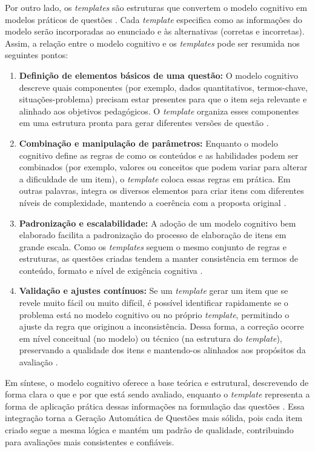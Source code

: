 Por outro lado, os \textit{templates} são estruturas que convertem o modelo cognitivo em modelos práticos de questões \cite{gierl2024}. Cada \textit{template} especifica como as informações do modelo serão incorporadas ao enunciado e às alternativas (corretas e incorretas). Assim, a relação entre o modelo cognitivo e os \textit{templates} pode ser resumida nos seguintes pontos:

\begin{enumerate} \item \textbf{Definição de elementos básicos de uma questão:} O modelo cognitivo descreve quais componentes (por exemplo, dados quantitativos, termos-chave, situações-problema) precisam estar presentes para que o item seja relevante e alinhado aos objetivos pedagógicos. O \textit{template} organiza esses componentes em uma estrutura pronta para gerar diferentes versões de questão \cite{lane2016}.
\item \textbf{Combinação e manipulação de parâmetros:} Enquanto o modelo cognitivo define as regras de como os conteúdos e as habilidades podem ser combinados (por exemplo, valores ou conceitos que podem variar para alterar a dificuldade de um item), o \textit{template} coloca essas regras em prática. Em outras palavras, integra os diversos elementos para criar itens com diferentes níveis de complexidade, mantendo a coerência com a proposta original \cite{embretson2017}.

\item \textbf{Padronização e escalabilidade:} A adoção de um modelo cognitivo bem elaborado facilita a padronização do processo de elaboração de itens em grande escala. Como os \textit{templates} seguem o mesmo conjunto de regras e estruturas, as questões criadas tendem a manter consistência em termos de conteúdo, formato e nível de exigência cognitiva \cite{gierl2016, gierl2017}.

\item \textbf{Validação e ajustes contínuos:} Se um \textit{template} gerar um item que se revele muito fácil ou muito difícil, é possível identificar rapidamente se o problema está no modelo cognitivo ou no próprio \textit{template}, permitindo o ajuste da regra que originou a inconsistência. Dessa forma, a correção ocorre em nível conceitual (no modelo) ou técnico (na estrutura do \textit{template}), preservando a qualidade dos itens e mantendo-os alinhados aos propósitos da avaliação \cite{gierlbulutzhang2018}.
\end{enumerate}
Em síntese, o modelo cognitivo oferece a base teórica e estrutural, descrevendo de forma clara o que e por que está sendo avaliado, enquanto o \textit{template} representa a forma de aplicação prática dessas informações na formulação das questões \cite{gierl2024}. Essa integração torna a Geração Automática de Questões mais sólida, pois cada item criado segue a mesma lógica e mantém um padrão de qualidade, contribuindo para avaliações mais consistentes e confiáveis.

